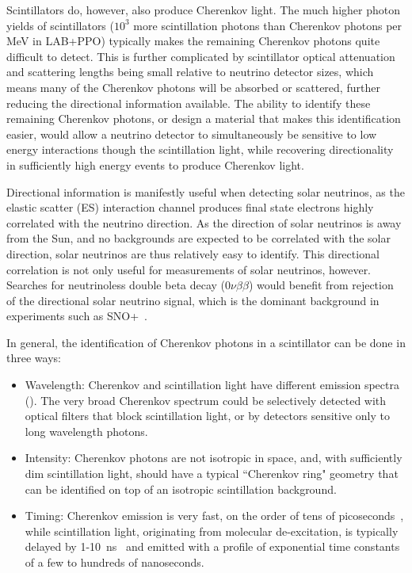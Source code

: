 Scintillators do, however, also produce Cherenkov light. 
The much higher photon yields of scintillators ($10^3$ more scintillation photons than Cherenkov photons per MeV in LAB+PPO) typically makes the remaining Cherenkov photons quite difficult to detect.
This is further complicated by scintillator optical attenuation and scattering lengths being small relative to neutrino detector sizes, which means many of the Cherenkov photons will be absorbed or scattered, further reducing the directional information available.
The ability to identify these remaining Cherenkov photons, or design a material that makes this identification easier, would allow a neutrino detector to simultaneously be sensitive to low energy interactions though the scintillation light, while recovering directionality in sufficiently high energy events to produce Cherenkov light.

Directional information is manifestly useful when detecting solar neutrinos, as the elastic scatter (ES) interaction channel produces final state electrons highly correlated with the neutrino direction. 
As the direction of solar neutrinos is away from the Sun, and no backgrounds are expected to be correlated with the solar direction, solar neutrinos are thus relatively easy to identify. 
This directional correlation is not only useful for measurements of solar neutrinos, however. Searches for neutrinoless double beta decay ($0\nu\beta\beta$) would benefit from rejection of the directional solar neutrino signal, which is the dominant background in experiments such as SNO+~\cite{snop}.

In general, the identification of Cherenkov photons in a scintillator can be done in three ways:
\begin{itemize}
    \item Wavelength:  Cherenkov and scintillation light have different emission spectra (). The very broad Cherenkov spectrum could be selectively detected with optical filters that block scintillation light, or by detectors sensitive only to long wavelength photons.
	\item Intensity: Cherenkov photons are not isotropic in space, and, with sufficiently dim scintillation light, should have a typical ``Cherenkov ring" geometry that can be identified on top of an isotropic scintillation background.
	\item Timing: Cherenkov emission is very fast, on the order of tens of picoseconds~\cite{cherenkov}, while scintillation light, originating from molecular de-excitation, is typically delayed by 1-10~ns~\cite{birks} and emitted with a profile of exponential time constants of a few to hundreds of nanoseconds.
\end{itemize}

